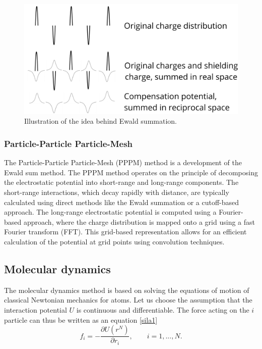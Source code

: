 \begin{figure}[htb!]
	\centering
	\includegraphics[width=0.8\linewidth]{img/ewald.png} 
	\caption{Illustration of the idea behind Ewald summation.}
	\label{fig:ewald}    
\end{figure} 

\subsubsection{Particle-Particle Particle-Mesh}
The Particle-Particle Particle-Mesh (PPPM) method \cite{eastwood_p3m3dpthree-dimensional_1980} is a development of the Ewald sum method. The PPPM method operates on the principle of decomposing the electrostatic potential into short-range and long-range components. The short-range interactions, which decay rapidly with distance, are typically calculated using direct methods like the Ewald summation or a cutoff-based approach. The long-range electrostatic potential is computed using a Fourier-based approach, where the charge distribution is mapped onto a grid using a fast Fourier transform (FFT). This grid-based representation allows for an efficient calculation of the potential at grid points using convolution techniques. \cite{Sritterova}


\subsection{Molecular dynamics}
The molecular dynamics method is based on solving the equations of motion of classical Newtonian mechanics for atoms. Let us choose the assumption that the interaction potential $U$ is continuous and differentiable. The force acting on the $i$ particle can thus be written as an equation \ref{sila1} 
\begin{equation}\label{sila1}
	f_i=-\frac{\partial U(r^N)}{\partial r_i}, \qquad i=1,...,N.
\end{equation}


